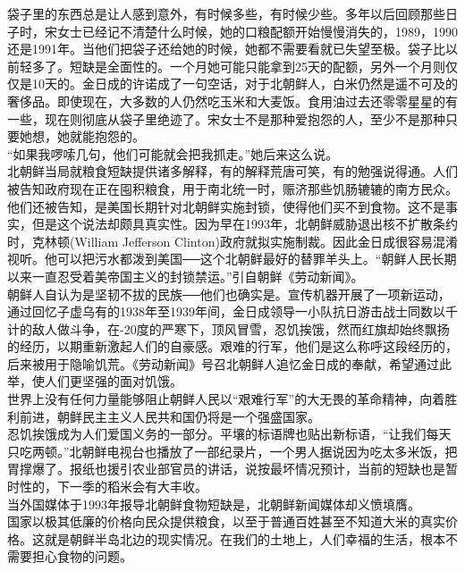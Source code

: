袋子里的东西总是让人感到意外，有时候多些，有时候少些。多年以后回顾那些日子时，宋女士已经记不清楚什么时候，她的口粮配额开始慢慢消失的，1989，1990还是1991年。当他们把袋子还给她的时候，她都不需要看就已失望至极。袋子比以前轻多了。短缺是全面性的。一个月她可能只能拿到25天的配额，另外一个月则仅仅是10天的。金日成的许诺成了一句空话，对于北朝鲜人，白米仍然是遥不可及的奢侈品。即使现在，大多数的人仍然吃玉米和大麦饭。食用油过去还零零星星的有一些，现在则彻底从袋子里绝迹了。宋女士不是那种爱抱怨的人，至少不是那种只要她想，她就能抱怨的。\\

“如果我啰嗦几句，他们可能就会把我抓走。”她后来这么说。\\

北朝鲜当局就粮食短缺提供诸多解释，有的解释荒唐可笑，有的勉强说得通。人们被告知政府现在正在囤积粮食，用于南北统一时，赈济那些饥肠辘辘的南方民众。他们还被告知，是美国长期针对北朝鲜实施封锁，使得他们买不到食物。这不是事实，但是这个说法却颇具真实性。因为早在1993年，北朝鲜威胁退出核不扩散条约时，克林顿(William Jefferson Clinton)政府就拟实施制裁。因此金日成很容易混淆视听。他可以把污水都泼到美国──这个北朝鲜最好的替罪羊头上。“朝鲜人民长期以来一直忍受着美帝国主义的封锁禁运。”引自朝鲜《劳动新闻》。\\

朝鲜人自认为是坚韧不拔的民族──他们也确实是。宣传机器开展了一项新运动，通过回忆子虚乌有的1938年至1939年间，金日成领导一小队抗日游击战士同数以千计的敌人做斗争，在-20度的严寒下，顶风冒雪，忍饥挨饿，然而红旗却始终飘扬的经历，以期重新激起人们的自豪感。艰难的行军，他们是这么称呼这段经历的，后来被用于隐喻饥荒。《劳动新闻》号召北朝鲜人追忆金日成的奉献，希望通过此举，使人们更坚强的面对饥饿。\\

世界上没有任何力量能够阻止朝鲜人民以“艰难行军”的大无畏的革命精神，向着胜利前进，朝鲜民主主义人民共和国仍将是一个强盛国家。\\

忍饥挨饿成为人们爱国义务的一部分。平壤的标语牌也贴出新标语，“让我们每天只吃两顿。”北朝鲜电视台也播放了一部纪录片，一个男人据说因为吃太多米饭，把胃撑爆了。报纸也援引农业部官员的讲话，说按最坏情况预计，当前的短缺也是暂时性的，下一季的稻米会有大丰收。\\

当外国媒体于1993年报导北朝鲜食物短缺是，北朝鲜新闻媒体却义愤填膺。\\

国家以极其低廉的价格向民众提供粮食，以至于普通百姓甚至不知道大米的真实价格。这就是朝鲜半岛北边的现实情况。在我们的土地上，人们幸福的生活，根本不需要担心食物的问题。\\

